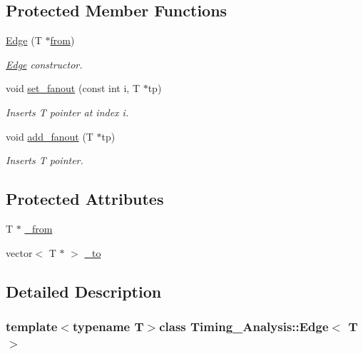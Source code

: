 \subsection*{Protected Member Functions}
\begin{DoxyCompactItemize}
\item 
\hyperlink{classTiming__Analysis_1_1Edge_a64a07a7a08de0e2fd29b1d1db98c5d2d}{Edge} (T $\ast$\hyperlink{classTiming__Analysis_1_1Edge_a47020ea89fd9fde438adc814a731a23d}{from})
\begin{DoxyCompactList}\small\item\em \hyperlink{classTiming__Analysis_1_1Edge}{Edge} constructor. \end{DoxyCompactList}\item 
void \hyperlink{classTiming__Analysis_1_1Edge_a81bc4f5f07902385b2234bf591822a52}{set\-\_\-fanout} (const int i, T $\ast$tp)
\begin{DoxyCompactList}\small\item\em Inserts T pointer at index i. \end{DoxyCompactList}\item 
void \hyperlink{classTiming__Analysis_1_1Edge_ab9195f5c50f8a66b29f6856c9629fcc8}{add\-\_\-fanout} (T $\ast$tp)
\begin{DoxyCompactList}\small\item\em Inserts T pointer. \end{DoxyCompactList}\end{DoxyCompactItemize}
\subsection*{Protected Attributes}
\begin{DoxyCompactItemize}
\item 
T $\ast$ \hyperlink{classTiming__Analysis_1_1Edge_a718ef7f37c4d9ddf867ef15eaa96ae43}{\-\_\-from}
\item 
vector$<$ T $\ast$ $>$ \hyperlink{classTiming__Analysis_1_1Edge_ae1bc9c1f6a84a2b4a116d5c4571fba02}{\-\_\-to}
\end{DoxyCompactItemize}


\subsection{Detailed Description}
\subsubsection*{template$<$typename T$>$class Timing\-\_\-\-Analysis\-::\-Edge$<$ T $>$}

